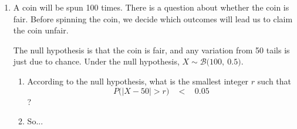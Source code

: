 \documentclass[12pt,letterpaper]{article}
\newcommand{\B}[2]{\mathcal{B}\big(#1,~#2\big)}
\begin{document}
\begin{enumerate}
\newpage

\item A coin will be spun 100 times. There is a question about whether the coin is fair. Before spinning the coin, we decide which outcomes will lead us to claim the coin unfair.

The null hypothesis is that the coin is fair, and any variation from 50 tails is just due to chance.  Under the null hypothesis, $X\sim\B{100}{0.5}$.
\begin{enumerate}
\item  According to the null hypothesis, what is the smallest integer $r$ such that $$P\Big(\big|X-50\big| > r\Big) ~~~~<~~~~ 0.05$$?
\vfill
\vfill
\item So...
\vfill

\end{enumerate}



\end{enumerate}
\end{document}
